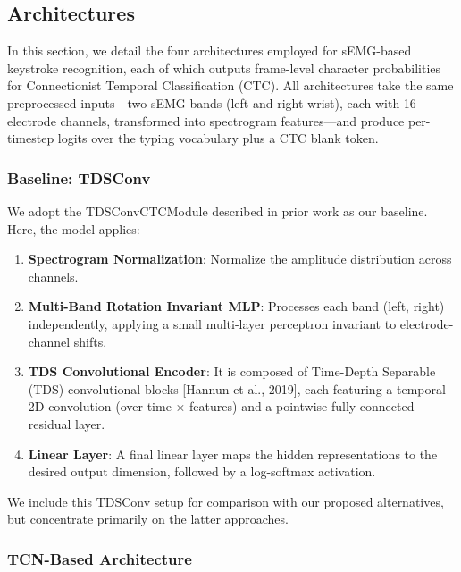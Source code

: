 \subsection{Architectures}

In this section, we detail the four architectures employed for sEMG-based keystroke recognition, each of which outputs frame-level character probabilities for Connectionist Temporal Classification (CTC). All architectures take the same preprocessed inputs—two sEMG bands (left and right wrist), each with 16 electrode channels, transformed into spectrogram features—and produce per-timestep logits over the typing vocabulary plus a CTC blank token.

\subsubsection{Baseline: TDSConv}

We adopt the TDSConvCTCModule described in prior work as our baseline. Here, the model applies:

\begin{enumerate}
    \item\textbf{Spectrogram Normalization}: Normalize the amplitude distribution across channels.

    \item\textbf{Multi-Band Rotation Invariant MLP}: Processes each band (left, right) independently, applying a small multi-layer perceptron invariant to electrode-channel shifts.

    \item\textbf{TDS Convolutional Encoder}: It is composed of Time-Depth Separable (TDS) convolutional blocks [Hannun et al., 2019], each featuring a temporal 2D convolution (over time × features) and a pointwise fully connected residual layer.
    
    \item\textbf{Linear Layer}: A final linear layer maps the hidden representations to the desired output dimension, followed by a log-softmax activation.
\end{enumerate}

We include this TDSConv setup for comparison with our proposed alternatives, but concentrate primarily on the latter approaches.

\subsubsection{TCN-Based Architecture}


